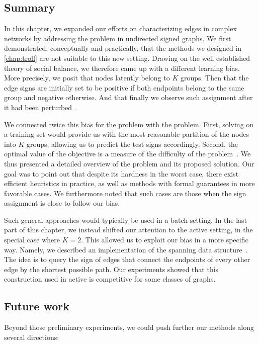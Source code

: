 \subsection{Summary}

In this chapter, we expanded our efforts on characterizing edges in complex networks by addressing
the \esp{} problem in undirected signed graphs. We first demonstrated, conceptually and practically,
that the methods we designed in \autoref{chap:troll} are not suitable to this new setting. Drawing
on the well established theory of social balance, we therefore came up with a different learning
bias. More precisely, we posit that nodes latently belong to $K$ groups. Then that the edge signs
are initially set to be positive if both endpoints belong to the same group and negative otherwise.
And that finally we observe such assignment after it had been perturbed \uar{}.

We connected twice this bias for the \esp{} problem with the \pcc{} problem. First, solving \pcc{}
on a training set would provide us with the most reasonable partition of the nodes into $K$ groups,
allowing us to predict the test signs accordingly. Second, the optimal value of the \pcc{} objective
is a measure of the difficulty of the \esp{} problem~\autocite{Cesa-Bianchi2012b}. We thus presented
a detailed overview of the \pcc{} problem and its proposed solution. Our goal was to point out that
despite its hardness in the worst case, there exist efficient heuristics in practice, as well as
methods with formal guarantees in more favorable cases. We furthermore noted that such cases are
those when the sign assignment is close to follow our bias.

Such general \pcc{} approaches would typically be used in a batch setting. In the last part of this
chapter, we instead shifted our attention to the active setting, in the special case where $K=2$.
This allowed us to exploit our bias in a more specific way. Namely, we described an implementation
of the \gtx{} spanning data structure~\autocite{gtxFabio}. The idea is to query the sign of edges
that connect the endpoints of every other edge by the shortest possible path.  Our experiments
showed that this \gtx{} construction used in active \esp{} is competitive for some classes of
graphs.

\subsection{Future work}

Beyond those preliminary experiments, we could push further our methods along several directions:

